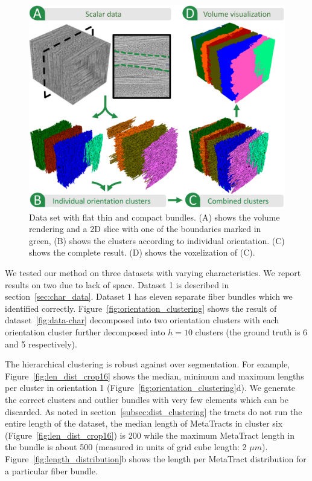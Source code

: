 \begin{figure}[tb]
\centering
	\includegraphics[width=\linewidth]{images_pvis/dataset2.pdf}
	\caption{Data set with flat thin and compact bundles. (A) shows the volume rendering and a 2D slice with one of the boundaries marked in green, (B) shows the clusters according to individual orientation. (C) shows the complete result. (D) shows the voxelization of (C).}
	\label{fig:prepreg}
\end{figure}


We tested our method on three datasets with varying characteristics. We report results on two due to lack of space.  
Dataset 1 is described in section~\ref{sec:char_data}. Dataset 1 has eleven separate fiber bundles which we identified correctly.
Figure~\ref{fig:orientation_clustering} shows the result of dataset~\ref{fig:data-char} decomposed into two orientation clusters with each orientation cluster further decomposed into $h=10$ clusters (the ground truth is 6 and 5 respectively). 

The hierarchical clustering is robust against over segmentation. For example,
Figure~\ref{fig:len_dist_crop16} shows the median, minimum and maximum lengths per cluster in orientation 1 (Figure~\ref{fig:orientation_clustering}d). We generate the correct clusters and outlier bundles with very few elements which can be discarded. As noted in section~\ref{subsec:dist_clustering} the tracts do not run the entire length of the dataset, the median length of MetaTracts in cluster six (Figure~\ref{fig:len_dist_crop16}) is 200 while the maximum MetaTract length in the bundle is about 500 (measured in units of grid cube length: 2 $\mu m$). Figure~\ref{fig:length_distribution}b shows the length per MetaTract distribution for a particular fiber bundle. 

